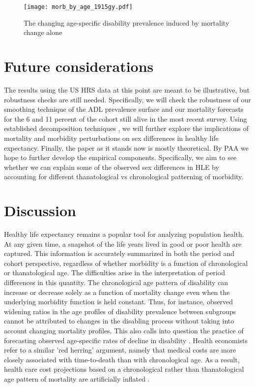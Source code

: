 \documentclass[11pt,oneside,a4paper]{article} %
\begin{document}
\begin{figure}
	\centering
		\texttt{[image: morb\_by\_age\_1915gy.pdf]}
	\caption{The changing age-specific disability prevalence induced by mortality change alone}
	\label{fig:morb_age}
\end{figure}



\section{Future considerations}
The results using the US HRS data at this point are meant to be illustrative, but robustness checks are still needed. Specifically, we will check the robustness of our smoothing technique of the ADL prevalence surface and our mortality forecasts for the 6 and 11 percent of the cohort still alive in the most recent survey. Using established decomposition techniques \citep{Andreev2002,Horiuchi2008}, we will further explore the implications of mortality and morbidity perturbations on sex differences in healthy life expectancy. 
Finally, the paper as it stands now is mostly theoretical. By PAA we hope to further develop the empirical components. Specifically, we aim to see whether we can explain some of the observed sex differences in HLE by accounting for different thanatological vs chronological patterning of morbidity.


\section{Discussion}




Healthy life expectancy remains a popular tool for analyzing population health. At any given time, a snapshot of the life years lived in good or poor health are captured. This information is accurately summarized in both the period and cohort perspective, regardless of whether morbidity is a function of chronological or thanatological age. The difficulties arise in the interpretation of period differences in this quantity. The chronological age pattern of disability can increase or decrease solely as a function of mortality change even when the underlying morbidity function is held constant. Thus, for instance, observed widening ratios in the age profiles of disability prevalence between subgroups \citep{Crimmins2001} cannot be attributed to changes in the disabling process without taking into account changing mortality profiles. This also calls into question the practice of forecasting observed age-specific rates of decline in disability \citep{Manton2006,Khaw1999}. Health economists refer to a similar 'red herring' argument, namely that medical costs are more closely associated with time-to-death than with chronological age. As a result, health care cost projections based on a chronological rather than thanatological age pattern of mortality are artificially inflated \citep{Zweifel1999,Geue2014}.
\end{document}
